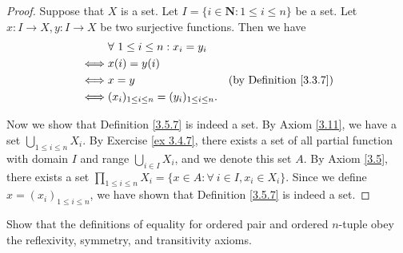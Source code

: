 \begin{proof}
Suppose that \(X\) is a set.
Let \(I = \{i \in \mathbf{N} : 1 \leq i \leq n\}\) be a set.
Let \(x : I \to X, y : I \to X\) be two surjective functions.
Then we have
\begin{align*}
& \forall\ 1 \leq i \leq n : x_i = y_i \\
\iff & x(i) = y(i) \\
\iff & x = y & \text{(by Definition \ref{3.3.7})} \\
\iff & (x_i)_{1 \leq i \leq n} = (y_i)_{1 \leq i \leq n}.
\end{align*}

Now we show that Definition \ref{3.5.7} is indeed a set.
By Axiom \ref{3.11}, we have a set \(\bigcup_{1 \leq i \leq n} X_i\).
By Exercise \ref{ex 3.4.7}, there exists a set of all partial function with domain \(I\) and range \(\bigcup_{i \in I} X_i\), and we denote this set \(A\).
By Axiom \ref{3.5}, there exists a set \(\prod_{1 \leq i \leq n} X_i = \{x \in A : \forall\ i \in I, x_i \in X_i\}\).
Since we define \(x = (x_i)_{1 \leq i \leq n}\), we have shown that Definition \ref{3.5.7} is indeed a set.
\end{proof}

\begin{exercise}\label{ex 3.5.3}
Show that the definitions of equality for ordered pair and ordered \(n\)-tuple obey the reflexivity, symmetry, and transitivity axioms.
\end{exercise}

